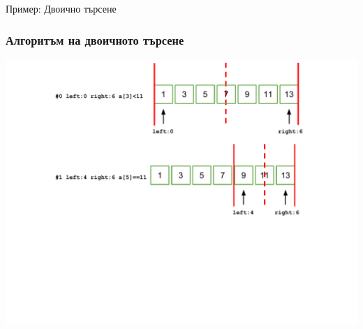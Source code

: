 \documentclass{beamer}
\begin{document}
\begin{frame}
\centerline{Пример: Двоично търсене}
\end{frame}

\begin{frame}[fragile]
\frametitle{Алгоритъм на двоичното търсене}

\includegraphics[width=14cm]{images/binsearch}

\end{frame}
\end{document}
